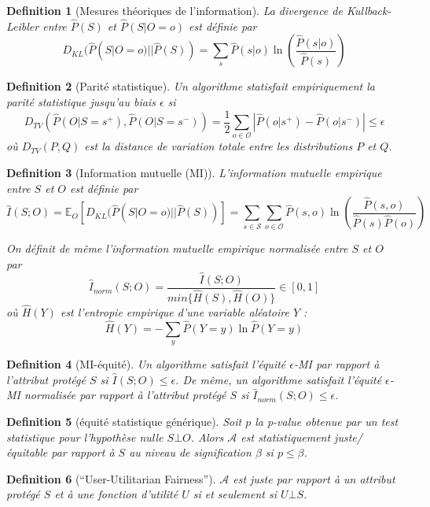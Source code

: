 \documentclass{article}
\newtheorem{myDef}{Definition}
\theoremstyle{definition}
\begin{document}
\begin{myDef}[Mesures théoriques de l'information]
  La divergence de Kullback-Leibler entre $\hat{P}(S)$ et $\hat{P}(S|O = o)$ est définie par
  \[
  D_{KL}(\hat{P}(S|O=o) || \hat{P}(S)) = \sum_{s} \hat{P}(s|o) \ln \left( \frac{\hat{P}(s|o)}{\hat{P}(s)} \right)
  \]
\end{myDef}

\begin{myDef}[Parité statistique]
  Un algorithme statisfait empiriquement la parité statistique jusqu'au biais $\epsilon$ si
  \[
  D_{TV}( \hat{P}(O|S=s^{+}), \hat{P}(O|S=s^{-})) = \frac{1}{2} \sum_{o \in \mathcal{O}} \left| \hat{P}(o|s^{+}) - \hat{P}(o|s^{-}) \right| \leq \epsilon
  \]
  où $D_{TV}(P,Q)$ est la distance de variation totale entre les distributions $P$ et $Q$.
\end{myDef}

\begin{myDef}[Information mutuelle (MI)]
  L'information mutuelle empirique entre $S$ et $O$ est définie par
  \[
  \hat{I}(S;O) = \mathbb{E}_{O} \left[ D_{KL}(\hat{P}(S|O=o) || \hat{P}(S)) \right] = \sum_{s \in \mathcal{S}} \sum_{o \in \mathcal{O}} \hat{P}(s,o) \ln \left( \frac{\hat{P}(s,o)}{\hat{P}(s) \hat{P}(o)} \right)
  \]

  On définit de même l'information mutuelle empirique normalisée entre $S$ et $O$ par
  \[
  \hat{I}_{norm}(S;O) = \frac{\hat{I}(S;O)}{min\{ \hat{H}(S), \hat{H}(O) \}} \in \left[ 0, 1 \right]
  \]
  où $\hat{H}(Y)$ est l'entropie empirique d'une variable aléatoire $Y$ : \[\hat{H}(Y) = - \sum_{y} \hat{P}(Y=y) \ln \hat{P}(Y=y)\]
\end{myDef}

\begin{myDef}[MI-équité]
  Un algorithme satisfait l'équité $\epsilon$-MI par rapport à l'attribut protégé $S$ si $\hat{I}(S;O) \leq \epsilon$.
  De même, un algorithme satisfait l'équité $\epsilon$-MI normalisée par rapport à l'attribut protégé $S$ si $\hat{I}_{norm}(S;O) \leq \epsilon$.
\end{myDef}

\begin{myDef}[équité statistique générique]
  Soit $p$ la p-value obtenue par un test statistique pour l'hypothèse nulle $S \bot O$. Alors $\mathcal{A}$ est statistiquement juste\slash équitable par rapport à $S$ au niveau de signification $\beta$ si $p \leq \beta$.
\end{myDef}

\begin{myDef}[``User-Utilitarian Fairness'']
  $\mathcal{A}$ est juste par rapport à un attribut protégé $S$ et à une fonction d'utilité $U$ si et seulement si $U \bot S$.
\end{myDef}
\end{document}
